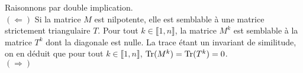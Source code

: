 \begin{solution}
    Raisonnons par double implication. \\
    $(\Leftarrow)$ Si la matrice $M$ est nilpotente, elle est semblable à une matrice strictement triangulaire $T$. Pour tout $k \in \llbracket 1, n \rrbracket$, la matrice $M^k$ est semblable à la matrice $T^k$ dont la diagonale est nulle. La trace étant un invariant de similitude, on en déduit que pour tout $k \in \llbracket 1, n \rrbracket$, $\mathrm{Tr}(M^k) = \mathrm{Tr}(T^k) = 0$. \\
    $(\Rightarrow)$
\end{solution}